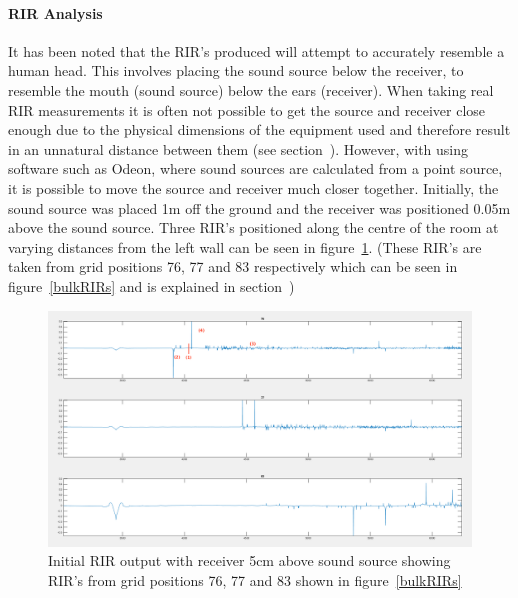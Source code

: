 \documentclass[../../main.tex]{subfiles}
\begin{document}
			\paragraph{RIR Analysis}
			It has been noted that the \ac{RIR}'s produced will attempt to accurately resemble a human head. This involves placing the sound source below the receiver, to resemble the mouth (sound source) below the ears (receiver). When taking real \ac{RIR} measurements it is often not possible to get the source and receiver close enough due to the physical dimensions of the equipment used and therefore result in an unnatural distance between them (see section~). However, with using software such as Odeon, where sound sources are calculated from a point source, it is possible to move the source and receiver much closer together. Initially, the sound source was placed 1m off the ground and the receiver was positioned 0.05m above the sound source. Three \ac{RIR}'s positioned along the centre of the room at varying distances from the left wall can be seen in figure~\ref{incorrectRIR}. (These \ac{RIR}'s are taken from grid positions 76, 77 and 83 respectively which can be seen in figure~\ref{bulkRIRs} and is explained in section~)



			\begin{figure}[H]
				\centerline{\includegraphics[scale = 0.3]{Sections/Implementation/Odeon/images/incorrectRIR/RIR_76_incorrect_edit.png}}
				\caption{Initial \ac{RIR} output with receiver 5cm above sound source showing \ac{RIR}'s from grid positions 76, 77 and 83 shown in figure~\ref{bulkRIRs}}
				\label{incorrectRIR}
			\end{figure}
\end{document}
